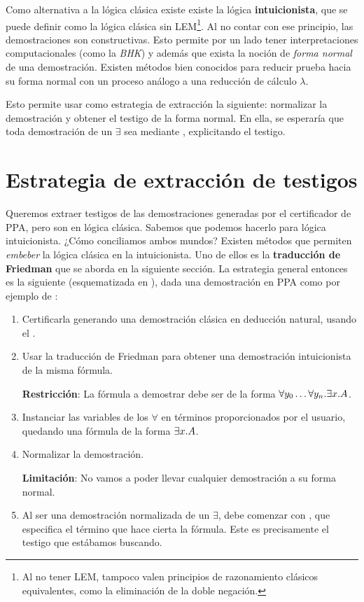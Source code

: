 Como alternativa a la lógica clásica existe existe la lógica
\textbf{intuicionista}, que se puede definir como la lógica clásica sin LEM\footnote{Al no tener LEM, tampoco valen principios de razonamiento clásicos equivalentes,
como la eliminación de la doble negación.}. Al
no contar con ese principio, las demostraciones son constructivas. Esto permite
por un lado tener interpretaciones computacionales (como la \textit{BHK}) y
además que exista la noción de \textit{forma normal} de una demostración.
Existen métodos bien conocidos para reducir prueba hacia su forma normal con un
proceso análogo a una reducción de cálculo $\lambda$. 

Esto permite usar como estrategia de extracción la siguiente: normalizar la
demostración y obtener el testigo de la forma normal. En ella, se esperaría que
toda demostración de un $\exists$ sea mediante , explicitando el
testigo.

\section{Estrategia de extracción de testigos}

Queremos extraer testigos de las demostraciones generadas por el certificador de
PPA, pero son en lógica clásica. Sabemos que podemos hacerlo para lógica
intuicionista. ¿Cómo conciliamos ambos mundos? Existen métodos que permiten
\textit{embeber} la lógica clásica en la intuicionista. Uno de ellos es la
\textbf{traducción de Friedman} que se aborda en la siguiente sección. La
estrategia general entonces es la siguiente (esquematizada en ), dada una demostración en PPA como
por ejemplo de :
\begin{enumerate}
    \item Certificarla generando una demostración clásica en deducción natural,
    usando el \modCertifier{}.
    \item Usar la traducción de Friedman para obtener una demostración
    intuicionista de la misma fórmula.

    \textbf{Restricción}: La fórmula a demostrar debe ser de la forma
    $\forall y_0 \dots \forall y_n . \exists x . A$.
    \item Instanciar las variables de los $\forall$ en términos proporcionados
    por el usuario, quedando una fórmula de la forma $\exists x . A$.
    \item Normalizar la demostración.
    
    \textbf{Limitación}: No vamos a poder llevar cualquier demostración a su
    forma normal.

    \item Al ser una demostración normalizada de un $\exists$, debe comenzar con
    , que especifica el término que hace cierta la fórmula. Este
    es precisamente el testigo que estábamos buscando.

    \proofTreeExistsI
\end{enumerate}


